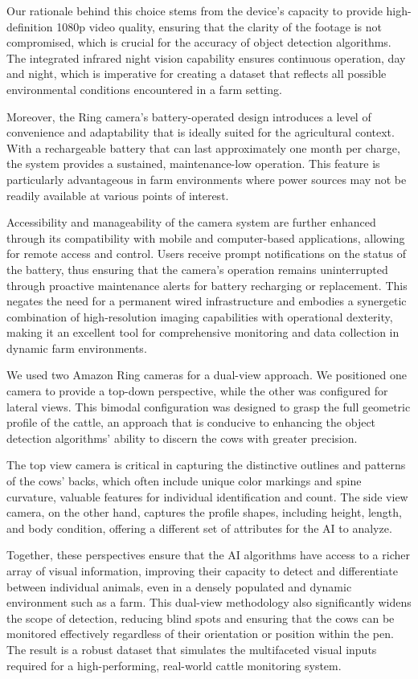 Our rationale behind this choice stems from the device's capacity to provide high-definition 1080p video quality, ensuring that the clarity of the footage is not compromised, which is crucial for the accuracy of object detection algorithms. The integrated infrared night vision capability ensures continuous operation, day and night, which is imperative for creating a dataset that reflects all possible environmental conditions encountered in a farm setting.

Moreover, the Ring camera's battery-operated design introduces a level of convenience and adaptability that is ideally suited for the agricultural context. With a rechargeable battery that can last approximately one month per charge, the system provides a sustained, maintenance-low operation. This feature is particularly advantageous in farm environments where power sources may not be readily available at various points of interest.

Accessibility and manageability of the camera system are further enhanced through its compatibility with mobile and computer-based applications, allowing for remote access and control. Users receive prompt notifications on the status of the battery, thus ensuring that the camera's operation remains uninterrupted through proactive maintenance alerts for battery recharging or replacement. This negates the need for a permanent wired infrastructure and embodies a synergetic combination of high-resolution imaging capabilities with operational dexterity, making it an excellent tool for comprehensive monitoring and data collection in dynamic farm environments.


We used two Amazon Ring cameras for a dual-view approach. We positioned one camera to provide a top-down perspective, while the other was configured for lateral views. This bimodal configuration was designed to grasp the full geometric profile of the cattle, an approach that is conducive to enhancing the object detection algorithms' ability to discern the cows with greater precision.

The top view camera is critical in capturing the distinctive outlines and patterns of the cows' backs, which often include unique color markings and spine curvature, valuable features for individual identification and count. The side view camera, on the other hand, captures the profile shapes, including height, length, and body condition, offering a different set of attributes for the AI to analyze.

Together, these perspectives ensure that the AI algorithms have access to a richer array of visual information, improving their capacity to detect and differentiate between individual animals, even in a densely populated and dynamic environment such as a farm. This dual-view methodology also significantly widens the scope of detection, reducing blind spots and ensuring that the cows can be monitored effectively regardless of their orientation or position within the pen. The result is a robust dataset that simulates the multifaceted visual inputs required for a high-performing, real-world cattle monitoring system.




